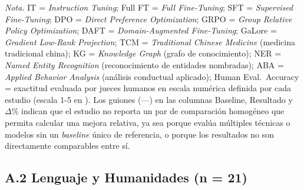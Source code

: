 \begin{flushleft}
\scriptsize
\textit{Nota.} IT = \textit{Instruction Tuning}; Full FT = \textit{Full Fine-Tuning}; SFT = \textit{Supervised Fine-Tuning}; DPO = \textit{Direct Preference Optimization}; GRPO = \textit{Group Relative Policy Optimization}; DAFT = \textit{Domain-Augmented Fine-Tuning}; GaLore = \textit{Gradient Low-Rank Projection}; TCM = \textit{Traditional Chinese Medicine} (medicina tradicional china); KG = \textit{Knowledge Graph} (grafo de conocimiento); NER = \textit{Named Entity Recognition} (reconocimiento de entidades nombradas); ABA = \textit{Applied Behavior Analysis} (análisis conductual aplicado); Human Eval.\ Accuracy = exactitud evaluada por jueces humanos en escala numérica definida por cada estudio (escala 1-5 en \autocite{rullo2025cardio}). Los guiones (---) en las columnas Baseline, Resultado y $\Delta$\% indican que el estudio no reporta un par de comparación homogéneo que permita calcular una mejora relativa, ya sea porque evalúa múltiples técnicas o modelos sin un \textit{baseline} único de referencia, o porque los resultados no son directamente comparables entre sí.
\end{flushleft}

\subsection*{A.2 \quad Lenguaje y Humanidades \texorpdfstring{(n = 21)}{(n = 21)}}

